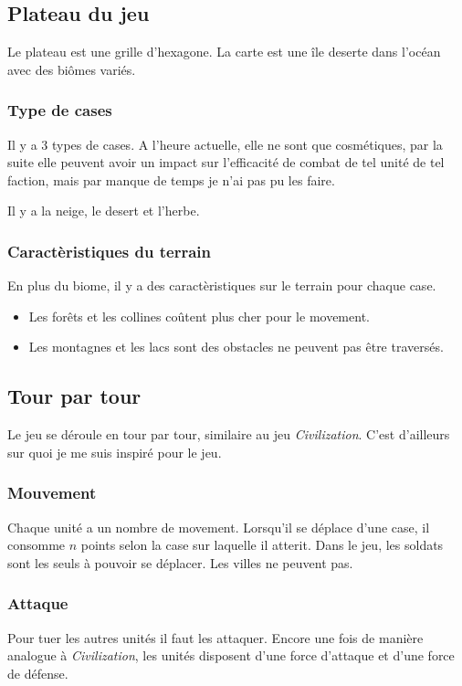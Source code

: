 \documentclass{article}
\begin{document}
\subsection{Plateau du jeu}
Le plateau est une grille d'hexagone. La carte est une île deserte dans l'océan avec des biômes variés.

\subsubsection{Type de cases}
Il y a 3 types de cases. A l'heure actuelle, elle ne sont que cosmétiques, par la suite elle peuvent avoir un impact sur l'efficacité de combat de tel unité de
tel faction, mais par manque de temps je n'ai pas pu les faire.

Il y a la neige, le desert et l'herbe.

\subsubsection{Caractèristiques du terrain}
En plus du biome, il y a des caractèristiques sur le terrain pour chaque case.

\begin{itemize}
    \item Les forêts et les collines coûtent plus cher pour le movement.
    \item Les montagnes et les lacs sont des obstacles ne peuvent pas être traversés.
\end{itemize}

\subsection{Tour par tour}
Le jeu se déroule en tour par tour, similaire au jeu \textit{Civilization}. C'est d'ailleurs
sur quoi je me suis inspiré pour le jeu.

\subsubsection{Mouvement}

Chaque unité a un nombre de movement. Lorsqu'il se déplace d'une case, il consomme $n$ points selon la case sur laquelle il atterit.
Dans le jeu, les soldats sont les seuls à pouvoir se déplacer. Les villes ne peuvent pas.

\subsubsection{Attaque}
Pour tuer les autres unités il faut les attaquer. Encore une fois de manière analogue à \textit{Civilization},
les unités disposent d'une force d'attaque et d'une force de défense.
\end{document}
